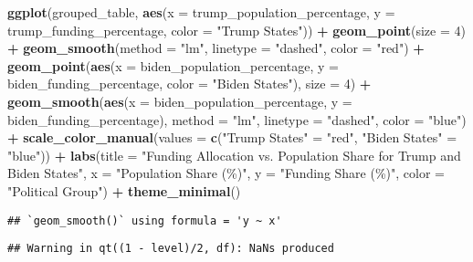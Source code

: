 \documentclass[
]{article}
\newenvironment{Shaded}{\begin{snugshade}}{\end{snugshade}}
\newcommand{\AttributeTok}[1]{\textcolor[rgb]{0.13,0.29,0.53}{#1}}
\newcommand{\DecValTok}[1]{\textcolor[rgb]{0.00,0.00,0.81}{#1}}
\newcommand{\FunctionTok}[1]{\textcolor[rgb]{0.13,0.29,0.53}{\textbf{#1}}}
\newcommand{\NormalTok}[1]{#1}
\newcommand{\OtherTok}[1]{\textcolor[rgb]{0.56,0.35,0.01}{#1}}
\newcommand{\SpecialCharTok}[1]{\textcolor[rgb]{0.81,0.36,0.00}{\textbf{#1}}}
\newcommand{\StringTok}[1]{\textcolor[rgb]{0.31,0.60,0.02}{#1}}
\begin{document}
\begin{Shaded}
\begin{Highlighting}[]
\FunctionTok{ggplot}\NormalTok{(grouped\_table, }\FunctionTok{aes}\NormalTok{(}\AttributeTok{x =}\NormalTok{ trump\_population\_percentage, }\AttributeTok{y =}\NormalTok{ trump\_funding\_percentage, }\AttributeTok{color =} \StringTok{"Trump States"}\NormalTok{)) }\SpecialCharTok{+}
  \FunctionTok{geom\_point}\NormalTok{(}\AttributeTok{size =} \DecValTok{4}\NormalTok{) }\SpecialCharTok{+}
  \FunctionTok{geom\_smooth}\NormalTok{(}\AttributeTok{method =} \StringTok{"lm"}\NormalTok{, }\AttributeTok{linetype =} \StringTok{"dashed"}\NormalTok{, }\AttributeTok{color =} \StringTok{"red"}\NormalTok{) }\SpecialCharTok{+}
  \FunctionTok{geom\_point}\NormalTok{(}\FunctionTok{aes}\NormalTok{(}\AttributeTok{x =}\NormalTok{ biden\_population\_percentage, }\AttributeTok{y =}\NormalTok{ biden\_funding\_percentage, }\AttributeTok{color =} \StringTok{"Biden States"}\NormalTok{), }\AttributeTok{size =} \DecValTok{4}\NormalTok{) }\SpecialCharTok{+}
  \FunctionTok{geom\_smooth}\NormalTok{(}\FunctionTok{aes}\NormalTok{(}\AttributeTok{x =}\NormalTok{ biden\_population\_percentage, }\AttributeTok{y =}\NormalTok{ biden\_funding\_percentage), }
              \AttributeTok{method =} \StringTok{"lm"}\NormalTok{, }\AttributeTok{linetype =} \StringTok{"dashed"}\NormalTok{, }\AttributeTok{color =} \StringTok{"blue"}\NormalTok{) }\SpecialCharTok{+}
  \FunctionTok{scale\_color\_manual}\NormalTok{(}\AttributeTok{values =} \FunctionTok{c}\NormalTok{(}\StringTok{"Trump States"} \OtherTok{=} \StringTok{"red"}\NormalTok{, }\StringTok{"Biden States"} \OtherTok{=} \StringTok{"blue"}\NormalTok{)) }\SpecialCharTok{+}
  \FunctionTok{labs}\NormalTok{(}\AttributeTok{title =} \StringTok{"Funding Allocation vs. Population Share for Trump and Biden States"}\NormalTok{,}
       \AttributeTok{x =} \StringTok{"Population Share (\%)"}\NormalTok{,}
       \AttributeTok{y =} \StringTok{"Funding Share (\%)"}\NormalTok{,}
       \AttributeTok{color =} \StringTok{"Political Group"}\NormalTok{) }\SpecialCharTok{+}
  \FunctionTok{theme\_minimal}\NormalTok{()}
\end{Highlighting}
\end{Shaded}

\begin{verbatim}
## `geom_smooth()` using formula = 'y ~ x'
\end{verbatim}

\begin{verbatim}
## Warning in qt((1 - level)/2, df): NaNs produced
\end{verbatim}
\end{document}
